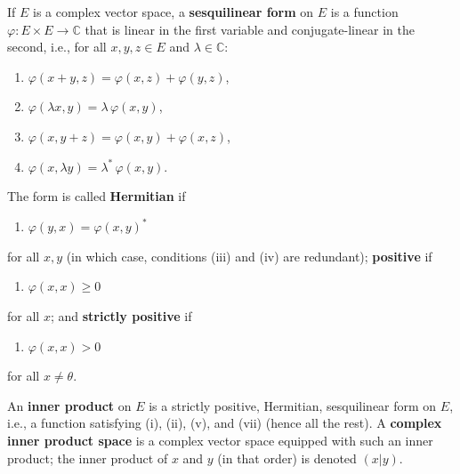 If $E$ is a complex vector space, a \textbf{sesquilinear form} on $E$ is a function $\varphi \colon E \times E \to \mathbb{C}$ that is linear in the first variable and conjugate-linear in the second, i.e., for all $x, y, z \in E$ and $\lambda \in \mathbb{C}$:

\begin{enumerate}
\item[(i)] $\varphi(x + y, z) = \varphi(x, z) + \varphi(y, z)$,
\item[(ii)] $\varphi(\lambda x, y) = \lambda\,\varphi(x, y)$,
\item[(iii)] $\varphi(x, y + z) = \varphi(x, y) + \varphi(x, z)$,
\item[(iv)] $\varphi(x, \lambda y) = \lambda^*\,\varphi(x, y)$.
\end{enumerate}

The form is called \textbf{Hermitian} if

\begin{enumerate}
\item[(v)] $\varphi(y, x) = \varphi(x, y)^*$
\end{enumerate}

for all $x, y$ (in which case, conditions (iii) and (iv) are redundant); \textbf{positive} if

\begin{enumerate}
\item[(vi)] $\varphi(x, x) \geq 0$
\end{enumerate}

for all $x$; and \textbf{strictly positive} if

\begin{enumerate}
\item[(vii)] $\varphi(x, x) > 0$
\end{enumerate}

for all $x \neq \theta$.

An \textbf{inner product} on $E$ is a strictly positive, Hermitian, sesquilinear form on $E$, i.e., a function satisfying (i), (ii), (v), and (vii) (hence all the rest). A \textbf{complex inner product space} is a complex vector space equipped with such an inner product; the inner product of $x$ and $y$ (in that order) is denoted $(x|y)$.
